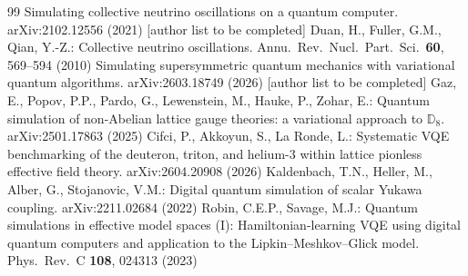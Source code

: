 \begin{thebibliography}{99}
 Simulating collective neutrino oscillations on a quantum computer. arXiv:2102.12556 (2021) [author list to be completed]
 Duan, H., Fuller, G.M., Qian, Y.-Z.: Collective neutrino oscillations. Annu.\ Rev.\ Nucl.\ Part.\ Sci.\ \textbf{60}, 569--594 (2010)
 Simulating supersymmetric quantum mechanics with variational quantum algorithms. arXiv:2603.18749 (2026) [author list to be completed]
 Gaz, E., Popov, P.P., Pardo, G., Lewenstein, M., Hauke, P., Zohar, E.: Quantum simulation of non-Abelian lattice gauge theories: a variational approach to $\mathbb{D}_8$. arXiv:2501.17863 (2025)
 Cifci, P., Akkoyun, S., La Ronde, L.: Systematic VQE benchmarking of the deuteron, triton, and helium-3 within lattice pionless effective field theory. arXiv:2604.20908 (2026)
 Kaldenbach, T.N., Heller, M., Alber, G., Stojanovic, V.M.: Digital quantum simulation of scalar Yukawa coupling. arXiv:2211.02684 (2022)
 Robin, C.E.P., Savage, M.J.: Quantum simulations in effective model spaces (I): Hamiltonian-learning VQE using digital quantum computers and application to the Lipkin--Meshkov--Glick model. Phys.\ Rev.\ C \textbf{108}, 024313 (2023)
\end{thebibliography}
